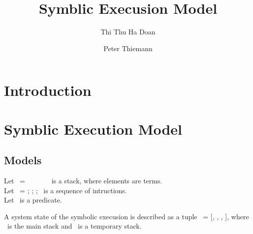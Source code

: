 \documentclass[runningheads]{llncs}
\begin{document}
%
\title{Symblic Execusion Model}
%
%
\author{Thi Thu Ha Doan\and
  Peter Thiemann}

%
%
%
\maketitle              %
%
\begin{abstract}
 

\keywords{}
\end{abstract}

%
%
%
\section{Introduction}
\label{sec:introduction}
\section{Symblic Execution Model}
\label{sec:symblic-execution-model}
\subsection{Models}
Let \STACK\ = \TermOne\ \STACKCONCAT\ \TermTwo\ \STACKCONCAT\ \DOT\ \STACKCONCAT\ \EMPTYSTACK\ is a stack, where elements are terms.
\\
Let \INSTRUCTION\ = \InstructionOne; \InstructionTwo; \DOT; \InstructionN\ is a sequence of intructions. 
\\
Let \PREDICATE\ is a predicate. 

\begin{definition}
A system state of the symbolic execusion is described as a tuple \STATE\ = [\INSTRUCTION, \STACK, \TSTACK, \PREDICATE], where \STACK\ is the main stack and \TSTACK\ is a temporary stack.
\end{definition}
\end{document}
